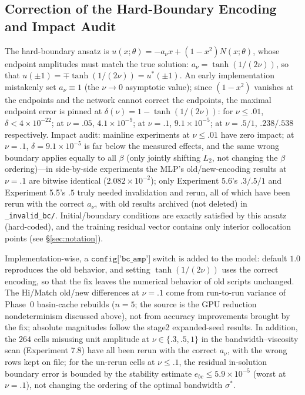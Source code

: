 \documentclass[11pt]{article}
\numberwithin{equation}{section}
\begin{document}
\subsection{Correction of the Hard-Boundary Encoding and Impact Audit}
The hard-boundary ansatz is $u(x;\theta)=-a_\nu x+(1-x^2)N(x;\theta)$, whose endpoint amplitudes must match the true solution: $a_\nu=\tanh(1/(2\nu))$, so that $u(\pm1)=\mp\tanh(1/(2\nu))=u^*(\pm1)$. An early implementation mistakenly set $a_\nu\equiv1$ (the $\nu\to0$ asymptotic value); since $(1-x^2)$ vanishes at the endpoints and the network cannot correct the endpoints, the maximal endpoint error is pinned at $\delta(\nu)=1-\tanh(1/(2\nu))$: for $\nu\le.01$, $\delta<4\times10^{-22}$; at $\nu=.05$, $4.1\times10^{-9}$; at $\nu=.1$, $9.1\times10^{-5}$; at $\nu=.5/1$, $.238/.538$ respectively. Impact audit: mainline experiments at $\nu\le.01$ have zero impact; at $\nu=.1$, $\delta=9.1\times10^{-5}$ is far below the measured effects, and the same wrong boundary applies equally to all $\beta$ (only jointly shifting $L_2$, not changing the $\beta$ ordering)---in side-by-side experiments the MLP's old/new-encoding results at $\nu=.1$ are bitwise identical ($2.082\times10^{-2}$); only Experiment 5.6's $.3/.5/1$ and Experiment 5.5's $.5$ truly needed invalidation and rerun, all of which have been rerun with the correct $a_\nu$, with old results archived (not deleted) in \texttt{\_\hspace{0pt}invalid\_\hspace{0pt}bc/\hspace{0pt}}. Initial/boundary conditions are exactly satisfied by this ansatz (hard-coded), and the training residual vector contains only interior collocation points (see \S\ref{sec:notation}).\par\smallskip
Implementation-wise, a $\texttt{config['bc\_amp']}$ switch is added to the model: default $1.0$ reproduces the old behavior, and setting $\tanh(1/(2\nu))$ uses the correct encoding, so that the fix leaves the numerical behavior of old scripts unchanged. The Hi/Match old/new differences at $\nu=.1$ come from run-to-run variance of Phase~0 basin-cache rebuilds ($n=5$; the source is the GPU reduction nondeterminism discussed above), not from accuracy improvements brought by the fix; absolute magnitudes follow the stage2 expanded-seed results. In addition, the $264$ cells misusing unit amplitude at $\nu\in\{.3,.5,1\}$ in the bandwidth--viscosity scan (Experiment 7.8) have all been rerun with the correct $a_\nu$, with the wrong rows kept on file; for the un-rerun cells at $\nu\le.1$, the residual in-solution boundary error is bounded by the stability estimate $e_{bc}\le5.9\times10^{-5}$ (worst at $\nu=.1$), not changing the ordering of the optimal bandwidth $\sigma^*$.
\end{document}
